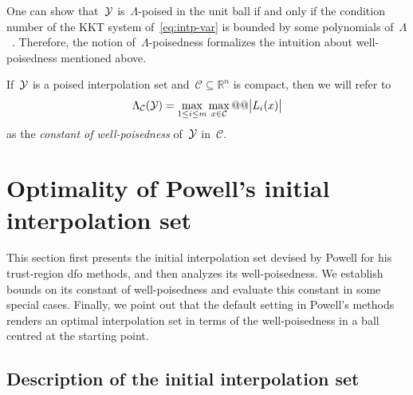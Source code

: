 \documentclass{article}
\makeatletter
\newcounter{cite}
\theoremstyle{definition}
\theoremstyle{plain}
\theoremstyle{remark}
\newcommand*{\abs}[2][]{#1\lvert#2#1\rvert}
\newcommand*{\R}{\mathbb{R}}
\newcommand*{\lagp}[1][]{L\ifblank{#1}{}{_{#1}}}
\newcommand*{\xpt}[1][]{\mathcal{Y}\ifblank{#1}{}{^{@#1}}}
\makeatother
\begin{document}
One can show that~$\xpt$ is~$\Lambda$-poised in the unit ball if and only if the condition number of the KKT system of~\eqref{eq:intp-var} is bounded by some polynomials of~$\Lambda$~\cite[Theorem~5.8]{Conn_Scheinberg_Vicente_2009}.
Therefore, the notion of~$\Lambda$-poisedness formalizes the intuition about well-poisedness mentioned above.

If~$\xpt$ is a poised interpolation set and~$\mathcal{C} \subseteq \R^n$ is compact, then we will refer to
\begin{equation*}
    \Lambda_{\mathcal{C}}(\xpt) = \max_{1 \le i \le m} \max_{x \in \mathcal{C}} @@ \abs[\big]{\lagp[i](x)}
\end{equation*}
as the \emph{constant of well-poisedness} of~$\xpt$ in~$\mathcal{C}$.

\section{Optimality of Powell's initial interpolation set}
\label{sec:main-result}

This section first presents the initial interpolation set devised by Powell for his trust-region \gls{dfo} methods, and then analyzes its well-poisedness.
We establish bounds on its constant of well-poisedness and evaluate this constant in some special cases.
Finally, we point out that the default setting in Powell's methods renders an optimal interpolation set in terms of the well-poisedness in a ball centred at the starting point.

\subsection{Description of the initial interpolation set}
\label{subsec:powell-set}
\end{document}
